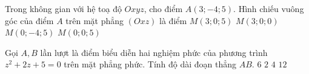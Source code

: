 \begin{ex}%
	Trong không gian với hệ toạ độ $Oxyz$, cho điểm $A(3;-4;5)$. Hình chiếu vuông góc của điểm $A$ trên mặt phẳng $(Oxz)$ là điểm
	\choice
	{\True $M(3;0;5)$}
	{$M(3;0;0)$}
	{$M(0;-4;5)$}
	{$M(0;0;5)$}
\end{ex}

\begin{ex}%
	Gọi $A,B$ lần lượt là điểm biểu diễn hai nghiệm phức của phương trình $z^2+2z+5=0$ trên mặt phẳng phức. Tính độ dài đoạn thẳng $AB$.
	\choice
	{$6$}
	{$2$}
	{\True $4$}
	{$12$}
	\loigiai{
		Ta có $z^2+2z+5=0 \Leftrightarrow (z+1)^2=4i^2 \Leftrightarrow \left[\begin{aligned}
		&z=-1+2i \\
		&z=-1-2i
		\end{aligned}\right. $.\\
		Đặt $A(-1;2),B(-1;-2)$, suy ra $\overrightarrow{AB}=(0;-4) \Rightarrow AB=4$.}
\end{ex}

